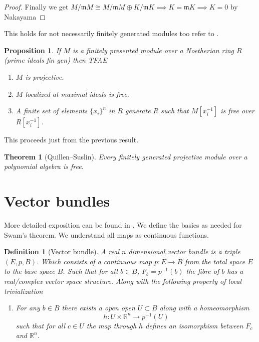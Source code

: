 \documentclass[12pt]{article}
\numberwithin{equation}{section}
\newcommand{\R}{\mathbb{R}}
\newtheorem{theorem}{Theorem}[section]
\newtheorem{definition}{Definition}[section]
\newtheorem{proposition}{Proposition}[section]
\begin{document}
\begin{appendices}
\begin{proof}
		Finally we get $M/\mathfrak{m}M \cong M/\mathfrak{m}M \oplus K/\mathfrak{m}K\implies K=\mathfrak{m}K \implies K=0$ by Nakayama
	\end{proof}
	This holds for not necessarily finitely generated modules too refer to \cite[Th.~2.5]{matsumura_1987}	.
	\begin{proposition} If $M$ is a finitely presented module over a Noetherian ring $R$ (prime ideals fin gen) then TFAE
		\begin{enumerate}
			\item $M$ is projective.
			\item $M$ localized at maximal ideals is free.
			\item A finite set of elements $\{x_i\}^n$ in $R$ generate $R$ such that $M[x_i^{-1}]$ is free over $R[x_i^{-1}]$.
		\end{enumerate}		
	\end{proposition}
	This proceeds just from the previous result.
	
	\begin{theorem}[Quillen–Suslin]
		Every finitely generated projective module over a polynomial algebra is free.
	\end{theorem}
	
	
	\section{Vector bundles}
	More detailed exposition can be found in \cite{milnor1974characteristic}. We define the basics as needed for Swam's theorem. We understand all maps as continuous functions.
	\begin{definition}[Vector bundle]
		A real $n$ dimensional vector bundle is a triple $(E,p, B)$. Which consists of a continuous map $p:E \to B$ from the total space $E$ to the base space $B$. Such that for all $b \in B$, $F_b=p^{-1}(b)$ the fibre of $b$ has a real/complex vector space structure. Along with the following property of local trivialization
		\begin{enumerate}
			 \item For any $b \in B$ there exists a open open $U \subset B$ along with a homeomorphism \[ h: U \times \R^n	\to p^{-1}(U) \] such that for all $c \in U$ the map through $h$ defines an isomorphism between $F_c$ and $\R^n$.
		\end{enumerate}
	\end{definition}
	

\end{appendices}
\end{document}
